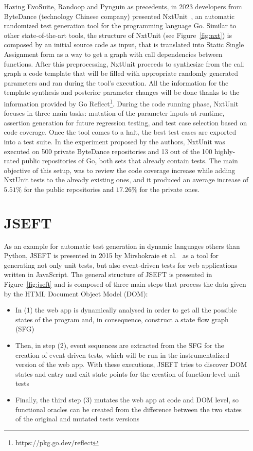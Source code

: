 \documentclass[%
  chapterprefix=false,%
  open=right,%
  twoside=true,%
  paper=a4,%
  logofile={Figures/logo.png},%
  thesistype=master,%
  UKenglish,%
]{se2thesis}
\begin{document}
Having EvoSuite, Randoop and Pynguin as precedents, in 2023 developers from ByteDance (technology Chinese company) presented NxtUnit~\cite{DBLP:conf/ease/WangMCGSP23}, an automatic randomized test generation tool for the programming language Go.
Similar to other state-of-the-art tools, the structure of NxtUnit (see Figure~\ref{fig:nxt}) is composed by an initial source code as input, that is translated into Static Single Assignment form as a way to get a graph with call dependencies between functions.
After this preprocessing, NxtUnit proceeds to synthesize from the call graph a code template that will be filled with appropriate randomly generated parameters and ran during the tool's execution.
All the information for the template synthesis and posterior parameter changes will be done thanks to the information provided by Go Reflect\footnote{https://pkg.go.dev/reflect}.
During the code running phase, NxtUnit focuses in three main tasks: mutation of the parameter inputs at runtime, assertion generation for future regression testing, and test case selection based on code coverage.
Once the tool comes to a halt, the best test cases are exported into a test suite.
In the experiment proposed by the authors, NxtUnit was executed on 500 private ByteDance repositories and 13 out of the 100 highly-rated public repositories of Go, both sets that already contain tests.
The main objective of this setup, was to review the code coverage increase while adding NxtUnit tests to the already existing ones, and it produced an average increase of \(5.51\%\) for the public repositories and \(17.26\%\) for the private ones.

\section{JSEFT}

As an example for automatic test generation in dynamic languages others than Python, JSEFT is presented in 2015 by Mirshokraie et al.~\cite{DBLP:conf/icst/Mirshokraie0P15} as a tool for generating not only unit tests, but also event-driven tests for web applications written in JavaScript.
The general structure of JSEFT is presented in Figure~\ref{fig:jseft} and is composed of three main steps that process the data given by the HTML Document Object Model (DOM):
\begin{itemize}
  \item In (1) the web app is dynamically analysed in order to get all the possible states of the program and, in consequence, construct a state flow graph (SFG)
  \item Then, in step (2), event sequences are extracted from the SFG for the creation of event-driven tests, which will be run in the instrumentalized version of the web app.
  With these executions, JSEFT tries to discover DOM states and entry and exit state points for the creation of function-level unit tests
  \item Finally, the third step (3) mutates the web app at code and DOM level, so functional oracles can be created from the difference between the two states of the original and mutated tests versions
\end{itemize}
\end{document}
